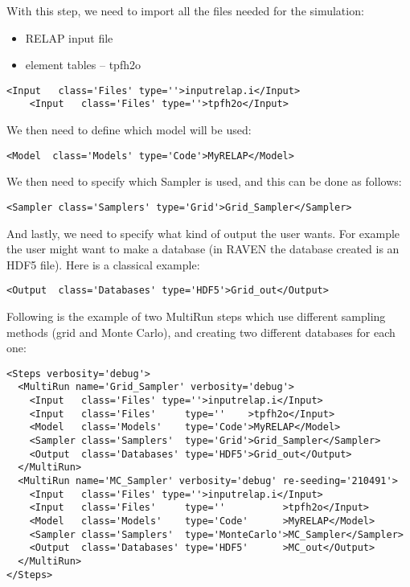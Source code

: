 With this step, we need to import all the files needed for the simulation:
\begin{itemize}
  \item RELAP input file
  \item element tables -- tpfh2o
\end{itemize}
\begin{lstlisting}[style=XML,morekeywords={name,class,type}]
    <Input   class='Files' type=''>inputrelap.i</Input>
    <Input   class='Files' type=''>tpfh2o</Input>
\end{lstlisting}
We then need to define which model will be used:
\begin{lstlisting}[style=XML]
    <Model  class='Models' type='Code'>MyRELAP</Model>
\end{lstlisting}
We then need to specify which Sampler is used, and this can be done as follows:
\begin{lstlisting}[style=XML]
    <Sampler class='Samplers' type='Grid'>Grid_Sampler</Sampler>
\end{lstlisting}
And lastly, we need to specify what kind of output the user wants.
%
For example the user might want to make a database (in RAVEN the database
created is an HDF5 file).
%
Here is a classical example:
\begin{lstlisting}[style=XML,morekeywords={class,type}]
    <Output  class='Databases' type='HDF5'>Grid_out</Output>
\end{lstlisting}
Following is the example of two MultiRun steps which use different sampling
methods (grid and Monte Carlo), and creating two different databases for each
one:
\begin{lstlisting}[style=XML]
<Steps verbosity='debug'>
  <MultiRun name='Grid_Sampler' verbosity='debug'>
    <Input   class='Files' type=''>inputrelap.i</Input>
    <Input   class='Files'     type=''    >tpfh2o</Input>
    <Model   class='Models'    type='Code'>MyRELAP</Model>
    <Sampler class='Samplers'  type='Grid'>Grid_Sampler</Sampler>
    <Output  class='Databases' type='HDF5'>Grid_out</Output>
  </MultiRun>
  <MultiRun name='MC_Sampler' verbosity='debug' re-seeding='210491'>
    <Input   class='Files' type=''>inputrelap.i</Input>
    <Input   class='Files'     type=''          >tpfh2o</Input>
    <Model   class='Models'    type='Code'      >MyRELAP</Model>
    <Sampler class='Samplers'  type='MonteCarlo'>MC_Sampler</Sampler>
    <Output  class='Databases' type='HDF5'      >MC_out</Output>
  </MultiRun>
</Steps>
\end{lstlisting}
